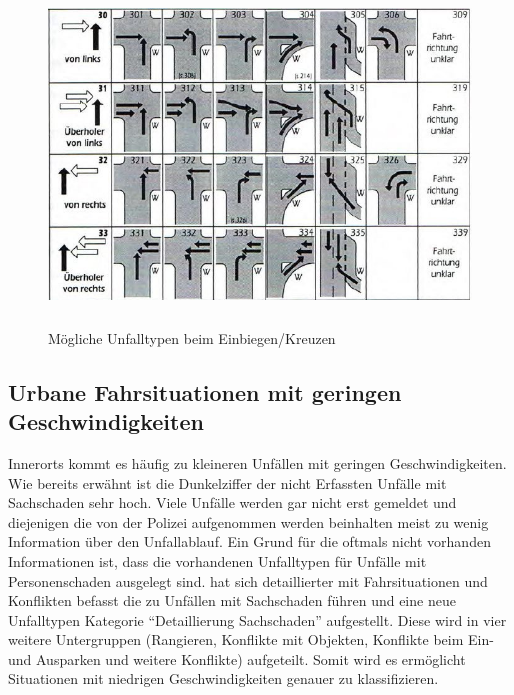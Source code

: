 \begin{savenotes}
	\begin{figure}[H]
		\centering
		\includegraphics[width=13cm,height=9cm]{figures/Einbiege-Unfall}
		\caption[Unfalltyp 3 Einbiegen/Kreuzen-Unfall]{Mögliche Unfalltypen beim Einbiegen/Kreuzen \parencite[S. 13]{GesamtverbandderDeutschenVersicherungswirtschafte.V..2016}}\label{fig:Einbiege-Unfall}
	\end{figure}
\end{savenotes}

\subsection{Urbane Fahrsituationen mit geringen Geschwindigkeiten}\label{Urabane Fahrsituationen mit geringen Geschwindigkeiten}
Innerorts kommt es häufig zu kleineren Unfällen mit geringen Geschwindigkeiten. Wie bereits erwähnt ist die Dunkelziffer der nicht Erfassten Unfälle mit Sachschaden sehr hoch. Viele Unfälle werden gar nicht erst gemeldet und diejenigen die von der Polizei aufgenommen werden beinhalten meist zu wenig Information über den Unfallablauf. Ein Grund für die oftmals nicht vorhanden Informationen ist, dass die vorhandenen Unfalltypen für Unfälle mit Personenschaden ausgelegt sind. \Textcite[S. 58]{Gschwendtner.2015} hat sich detaillierter mit Fahrsituationen und Konflikten befasst die zu Unfällen mit Sachschaden führen und eine neue Unfalltypen Kategorie \enquote{Detaillierung Sachschaden} aufgestellt. Diese wird in vier weitere Untergruppen (Rangieren, Konflikte mit Objekten, Konflikte beim Ein- und Ausparken und weitere Konflikte) aufgeteilt. Somit wird es ermöglicht Situationen mit niedrigen Geschwindigkeiten genauer zu klassifizieren.

